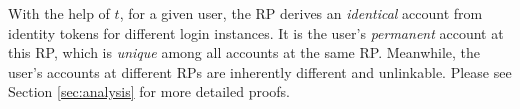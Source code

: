 %
%

With the help of $t$, for a given user, the RP derives an \emph{identical} account from identity tokens for different login instances. It is the user's \emph{permanent} account at this RP, which is \emph{unique} among all accounts at the same RP. Meanwhile, the user's accounts at different RPs are inherently different and unlinkable. Please see Section \ref{sec:analysis} for more detailed proofs.

